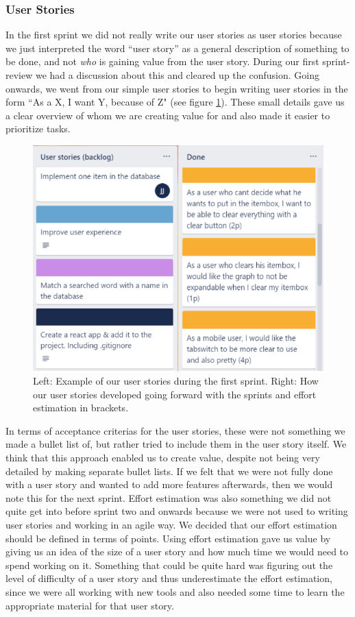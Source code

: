 \subsubsection{User Stories}
In the first sprint we did not really write our user stories as user stories because we just interpreted the word “user story” as a general description of something to be done, and not \emph{who} is gaining value from the user story. During our first sprint-review we had a discussion about this and cleared up the confusion. Going onwards, we went from our simple user stories to begin writing user stories in the form “As a X, I want Y, because of Z" (see figure \ref{fig:US}). These small details gave us a clear overview of whom we are creating value for and also made it easier to prioritize tasks.
\begin{figure}[h]
    \includegraphics[width=1\textwidth]{figures/US.PNG}
    \caption{Left: Example of our user stories during the first sprint. Right: How our user stories developed going forward with the sprints and effort estimation in brackets. }
    \label{fig:US}
\end{figure}

In terms of acceptance criterias for the user stories, these were not something we made a bullet list of, but rather tried to include them in the user story itself. We think that this approach enabled us to create value, despite not being very detailed by making separate bullet lists. If we felt that we were not fully done with a user story and wanted to add more features afterwards, then we would note this for the next sprint.   
Effort estimation was also something we did not quite get into before sprint two and onwards because we were not used to writing user stories and working in an agile way. We decided that our effort estimation should be defined in terms of points. Using effort estimation gave us value by giving us an idea of the size of a user story and how much time we would need to spend working on it. Something that could be quite hard was figuring out the level of difficulty of a user story and thus underestimate the effort estimation, since we were all working with new tools and also needed some time to learn the appropriate material for that user story. 

